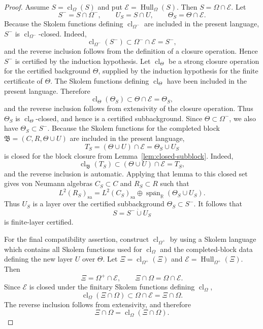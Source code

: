 \documentclass[11pt,letterpaper,reqno]{amsart}
\theoremstyle{definition}
\numberwithin{equation}{section}
\newcommand{\sa}{\mathrm{sa}}
\newcommand{\RR}{\mathbb R}
\newcommand{\cl}{\operatorname{cl}}
\DeclareMathOperator{\spanop}{span}
\DeclareMathOperator{\Hull}{Hull}
\begin{document}
\begin{proof}
Assume $S=\cl_\Omega(S)$ and put $\mathcal E=\Hull_\Omega(S)$.  Then $S=\Omega\cap\mathcal E$.  Let
\[
   S^- = S\cap\Omega^-,
   \qquad
   U_S=S\cap U,
   \qquad
   \Theta_S=\Theta\cap\mathcal E.
\]
Because the Skolem functions defining \(\cl_{\Omega^-}\) are included in the
present language, \(S^-\) is \(\cl_{\Omega^-}\)-closed.  Indeed,
\[
   \cl_{\Omega^-}(S^-)
   \subset \Omega^-\cap\mathcal E
   =
   S^-,
\]
and the reverse inclusion follows from the definition of a closure operation.
Hence \(S^-\) is certified by the induction hypothesis.  Let
\(\cl_\Theta\) be a strong closure operation for the certified background
\(\Theta\), supplied by the induction hypothesis for the finite certificate
of \(\Theta\).  The Skolem functions defining \(\cl_\Theta\) have been
included in the present language.  Therefore
\[
   \cl_\Theta(\Theta_S)
   \subset \Theta\cap\mathcal E
   =
   \Theta_S,
\]
and the reverse inclusion follows from extensivity of the closure operation.
Thus \(\Theta_S\) is \(\cl_\Theta\)-closed, and hence is a certified
subbackground.  Since \(\Theta\subset\Omega^-\), we also have
\(\Theta_S\subset S^-\).  Because the Skolem functions for the completed block
\(\mathfrak B=(C,R,\Theta\cup U)\) are included in the present language,
\[
   T_S=(\Theta\cup U)\cap\mathcal E=\Theta_S\cup U_S
\]
is closed for the block closure from Lemma~\ref{lem:closed-subblock}.  Indeed,
\[
   \cl_{\mathfrak B}(T_S)
   \subset
   (\Theta\cup U)\cap\mathcal E
   =
   T_S,
\]
and the reverse inclusion is automatic. Applying that lemma to this closed set gives von Neumann algebras $C_S\subset C$ and $R_S\subset R$ such that
\[
   L^2(R_S)_{\sa}=L^2(C_S)_{\sa}\oplus\overline{\spanop_{\RR}}(\Theta_S\cup U_S).
\]
Thus $U_S$ is a layer over the certified subbackground $\Theta_S\subset S^-$.  It follows that
\[
   S=S^-\dot\cup U_S
\]
is finite-layer certified.

For the final compatibility assertion, construct \(\cl_{\Omega^+}\) by using
a Skolem language which contains all Skolem functions used for \(\cl_\Omega\)
and the completed-block data defining the new layer \(U\) over \(\Theta\).
Let \(\Xi=\cl_{\Omega^+}(\Xi)\) and
\(\mathcal E=\Hull_{\Omega^+}(\Xi)\).  Then
\[
   \Xi=\Omega^+\cap\mathcal E,
   \qquad
   \Xi\cap\Omega=\Omega\cap\mathcal E.
\]
Since \(\mathcal E\) is closed under the finitary Skolem functions defining
\(\cl_\Omega\),
\[
   \cl_\Omega(\Xi\cap\Omega)\subset \Omega\cap\mathcal E=\Xi\cap\Omega.
\]
The reverse inclusion follows from extensivity, and therefore
\[
   \Xi\cap\Omega=\cl_\Omega(\Xi\cap\Omega).
\]


\end{proof}
\end{document}
